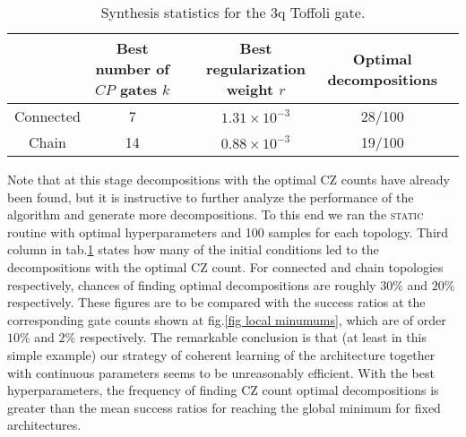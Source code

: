 \documentclass[twocolumn, amsfonts, amssymb, aps, nofootinbib]{revtex4-2}
\newcommand{\CZ}{CZ }
\newcommand{\CP}{CP }
\newcommand{\static}{\textsc{static }}
\begin{document}
\begin{table}[]
	\begin{tabular}{@{}cccccc@{}}
		\toprule
		& \shortstack[l]{Best number of\\ $\CP$ gates $k$} && \shortstack[l]{Best regularization\\ weight $r$} &  \shortstack[l]{Optimal \\ decompositions} &  \\ \midrule
		Connected & 7      && $1.31\times10^{-3}$ & 28/100                 &  \\
		Chain     & 14     && $0.88\times10^{-3}$ & 19/100                  &  \\ \bottomrule
	\end{tabular}
\caption {Synthesis statistics for the 3q Toffoli gate.}
\label{tab toff3}
\end{table}

Note that at this stage decompositions with the optimal \CZ counts have already been found, but it is instructive to further analyze the performance of the algorithm and generate more decompositions. To this end we ran the \static routine with optimal hyperparameters and 100 samples for each topology. Third column in tab.\ref{tab toff3} states how many of the initial conditions led to the decompositions with the optimal \CZ count. For connected and chain topologies respectively, chances of finding optimal decompositions are roughly $30\%$ and $20\%$ respectively. These figures are to be compared with the success ratios at the corresponding gate counts shown at fig.\ref{fig local minumums}, which are of order $10\%$ and $2\%$ respectively. The remarkable conclusion is that (at least in this simple example) our strategy of coherent learning of the architecture together with continuous parameters seems to be unreasonably efficient. With the best hyperparameters, the frequency of finding \CZ count optimal decompositions is greater than the mean success ratios for reaching the global minimum for fixed architectures.
\end{document}
